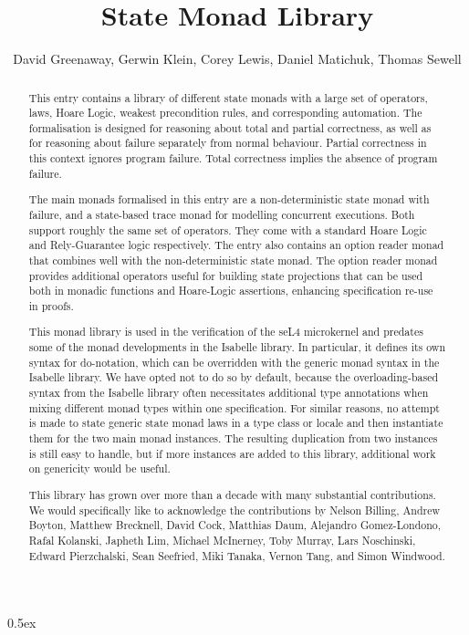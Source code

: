 \documentclass[11pt,a4paper]{report}
\begin{document}
\title{State Monad Library}
\author{David Greenaway,
  Gerwin Klein,
  Corey Lewis,
  Daniel Matichuk,
  Thomas Sewell}
\maketitle

\begin{abstract}
  This entry contains a library of different state monads with a large set of
  operators, laws, Hoare Logic, weakest precondition rules, and corresponding
  automation. The formalisation is designed for reasoning about total and
  partial correctness, as well as for reasoning about failure separately from
  normal behaviour. Partial correctness in this context ignores program failure.
  Total correctness implies the absence of program failure.

  The main monads formalised in this entry are a non-deterministic state monad
  with failure, and a state-based trace monad for modelling concurrent executions.
  Both support roughly the same set of operators. They come with a standard
  Hoare Logic and Rely-Guarantee logic respectively. The entry also contains an
  option reader monad that combines well with the non-deterministic state monad.
  The option reader monad provides additional operators useful for building
  state projections that can be used both in monadic functions and Hoare-Logic
  assertions, enhancing specification re-use in proofs.

  This monad library is used in the verification of the seL4 microkernel and
  predates some of the monad developments in the Isabelle library. In
  particular, it defines its own syntax for do-notation, which can be overridden
  with the generic monad syntax in the Isabelle library. We have opted not to do
  so by default, because the overloading-based syntax from the Isabelle library
  often necessitates additional type annotations when mixing different monad
  types within one specification. For similar reasons, no attempt is made to
  state generic state monad laws in a type class or locale and then instantiate
  them for the two main monad instances. The resulting duplication from two
  instances is still easy to handle, but if more instances are added to this
  library, additional work on genericity would be useful.

  This library has grown over more than a decade with many substantial
  contributions. We would specifically like to acknowledge the contributions by
  Nelson Billing, Andrew Boyton, Matthew Brecknell, David Cock, Matthias Daum,
  Alejandro Gomez-Londono, Rafal Kolanski, Japheth Lim, Michael McInerney, Toby
  Murray, Lars Noschinski, Edward Pierzchalski, Sean Seefried, Miki Tanaka, Vernon
  Tang, and Simon Windwood.
\end{abstract}

\tableofcontents

\parindent 0pt\parskip 0.5ex





\end{document}
